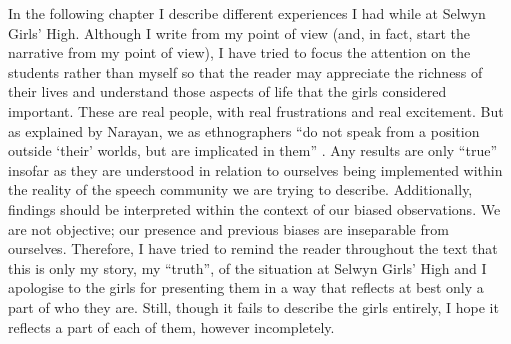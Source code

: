 In the following chapter I describe different experiences I had while at Selwyn Girls' High. Although I write from my point of view (and, in fact, start the narrative from my point of view), I have tried to focus the attention on the students rather than myself so that the reader may appreciate the richness of their lives and understand those aspects of life that the girls considered important. These are real people, with real frustrations and real excitement. But as explained by Narayan, we as ethnographers ``do not speak from a position outside `their' worlds, but are implicated in them'' \citet[676]{narayan1993}. Any results are only ``true'' insofar as they are understood in relation to ourselves being implemented within the reality of the speech community we are trying to describe. Additionally, findings should be interpreted within the context of our biased observations. We are not objective; our presence and previous biases are inseparable from ourselves. Therefore, I have tried to remind the reader throughout the text that this is only my story, my ``truth'', of the situation at Selwyn Girls' High and I apologise to the girls for presenting them in a way that reflects at best only a part of who they are. Still, though it fails to describe the girls entirely, I hope it reflects a part of each of them, however incompletely. 

